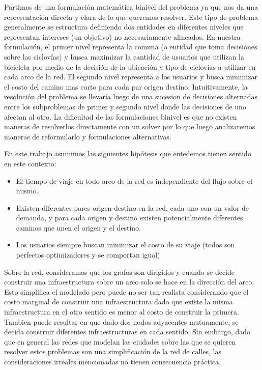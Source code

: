 \documentclass{article}
\begin{document}
  Partimos de una formulación matemática binivel del problema ya que nos da una representación directa y clara de lo que queremos resolver. Este tipo de problema generalmente se estructura definiendo dos entidades en diferentes niveles que representan intereses (un objetivo) no necesariamente alineados. En nuestra formulación, el primer nivel representa la comuna (o entidad que toma decisiónes sobre las ciclovías) y busca maximizar la cantidad de usuarios que utilizan la bicicleta por medio de la decisión de la ubicación y tipo de ciclovías a utilizar en cada arco de la red. El segundo nivel representa a los usuarios y busca minimizar el costo del camino mas corto para cada par origen destino. Intuitivamente, la resolución del problema se llevaría luego de una sucesion de decisiones alternadas entre los subproblemas de primer y segundo nivel donde las decisiones de uno afectan al otro.
  La dificultad de las formulaciones binivel es que no existen maneras de resolverlos directamente con un solver por lo que luego analizaremos maneras de reformularlo y formulaciones alternativas.

  En este trabajo asumimos las siguientes hipótesis que entedemos tienen sentido en este contexto:

  \begin{itemize}
    \item{El tiempo de viaje en todo arco de la red es independiente del flujo sobre el mismo.}
    \item{Existen diferentes pares origen-destino en la red, cada uno con un valor de demanda, y para cada origen y destino existen potencialmente diferentes caminos que unen el origen y el destino.}
    \item{Los usuarios siempre buscan minimizar el costo de su viaje (todos son
    perfectos optimizadores y se comportan igual)}
  \end{itemize}

  Sobre la red, consideramos que los grafos son dirigidos y cuando se decide construir una infraestructura sobre un arco solo se hace en la dirección del arco. Esto simplifica el modelado pero puede no ser tan realista considerando que el costo marginal de construir una infraestructura dado que existe la misma infraestructura en el otro sentido es menor al costo de construir la primera. Tambien puede resultar en que dado dos nodos adyacentes mutuamente, se decida construir diferentes infraestructuras en cada sentido. Sin embargo, dado que en general las redes que modelan las ciudades sobre las que se quieren resolver estos problemas son una simplificación de la red de calles, las consideraciones irreales mencionadas no tienen consecuencia práctica.
\end{document}
